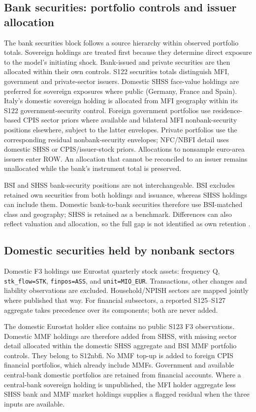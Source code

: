 \subsection{Bank securities: portfolio controls and issuer allocation}

The bank securities block follows a source hierarchy within observed portfolio totals. Sovereign holdings are treated first because they determine direct exposure to the model's initiating shock. Bank-issued and private securities are then allocated within their own controls.
S122 securities totals distinguish MFI, government and private-sector issuers. Domestic SHSS face-value holdings are preferred for sovereign exposures where public (Germany, France and Spain). Italy's domestic sovereign holding is allocated from MFI geography within its S122 government-security control. Foreign government portfolios use residence-based CPIS sector priors where available and bilateral MFI nonbank-security positions elsewhere, subject to the latter envelopes. Private portfolios use the corresponding residual nonbank-security envelopes; NFC/NBFI detail uses domestic SHSS or CPIS/issuer-stock priors. Allocations to nonsample euro-area issuers enter ROW. An allocation that cannot be reconciled to an issuer remains unallocated while the bank's instrument total is preserved.

BSI and SHSS bank-security positions are not interchangeable. BSI excludes retained own securities from both holdings and issuance, whereas SHSS holdings can include them. Domestic bank-to-bank securities therefore use BSI-matched class and geography; SHSS is retained as a benchmark. Differences can also reflect valuation and allocation, so the full gap is not identified as own retention \citep{ECBBSI2024}.

\subsection{Domestic securities held by nonbank sectors}
Domestic F3 holdings use Eurostat quarterly stock assets: frequency Q, \texttt{stk\_flow=STK}, \texttt{finpos=ASS}, and \texttt{unit=MIO\_EUR}. Transactions, other changes and liability observations are excluded. Household/NPISH sectors are mapped jointly where published that way. For financial subsectors, a reported S125--S127 aggregate takes precedence over its components; both are never added.

The domestic Eurostat holder slice contains no public S123 F3 observations. Domestic MMF holdings are therefore added from SHSS, with missing sector detail allocated within the domestic SHSS aggregate and BSI MMF portfolio controls. They belong to S12nbfi. No MMF top-up is added to foreign CPIS financial portfolios, which already include MMFs. Government and available central-bank domestic portfolios are retained from financial accounts. Where a central-bank sovereign holding is unpublished, the MFI holder aggregate less SHSS bank and MMF market holdings supplies a flagged residual when the three inputs are available.

